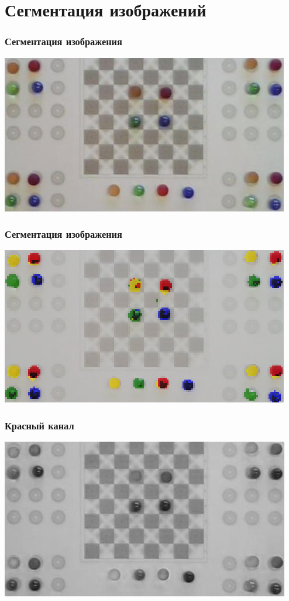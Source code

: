 \documentclass[24pt,pdf,hyperref={unicode}]{beamer}
\begin{document}
\section{Сегментация изображений}

\begin{frame}\frametitle{Сегментация изображения}
\includegraphics[width=\textwidth]{Images/Checkers-raw.png} 
\end{frame}

\begin{frame}\frametitle{Сегментация изображения}
\includegraphics[width=\textwidth]{Images/Checkers-segmented.png} 
\end{frame}

\begin{frame}\frametitle{Красный канал}
\includegraphics[width=\textwidth]{Images/Checkers-channel.png} 
\end{frame}
\end{document}
